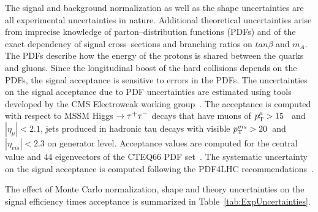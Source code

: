 The signal and background normalization as well as the shape uncertainties are
all experimental uncertainties in nature.  Additional theoretical uncertainties
arise from imprecise knowledge of parton--distribution functions (PDFs) and of
the exact dependency of signal cross--sections and branching ratios on
$tan\beta$ and $m_A$.  The PDFs describe how the energy of the protons is shared
between the quarks and gluons.  Since the longitudinal boost of the hard
collisions depends on the PDFs, the signal acceptance is sensitive to errors in
the PDFs.  The uncertainties on the signal acceptance due to PDF uncertainties
are estimated using tools developed by the CMS Electroweak working
group~\cite{CMS_EWK_pdfUncertaintyTools}.  The acceptance is computed with
respect to MSSM Higgs $\to \tau^+\tau^-$ decays that have muons of $p_{\mathrm{T}}^{\mu} > 15$~\GeVc
and $\left| \eta_{\mu} \right| < 2.1$, jets produced in hadronic tau decays with
visible $p_{\mathrm{T}}^{vis} > 20$~\GeVc and $\left| \eta_{vis} \right| < 2.3$ on
generator level.  Acceptance values are computed for the central value and $44$
eigenvectors of the CTEQ66 PDF set~\cite{CTEQpdfSet}.  The systematic
uncertainty on the signal acceptance is computed following the PDF4LHC
recommendations~\cite{pdfAccSys01,pdfAccSys02}.

The effect of Monte Carlo normalization, shape and theory uncertainties on the
signal efficiency times acceptance is summarized in
Table~\ref{tab:ExpUncertainties}.

